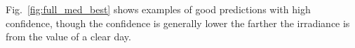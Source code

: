 Fig.~\ref{fig:full_med_best} shows examples of good predictions with high confidence, though the confidence is generally lower the farther the irradiance is from the value of a clear day.
\begin{figure}[ht!]
    \centering
    \qquad
    \qquad
    \qquad
    \qquad

\end{figure}
